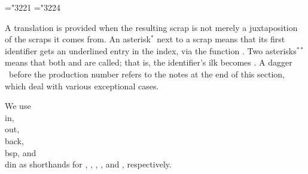 \def\v{\char'174}
\mathchardef\RA="3221 %
\mathchardef\BA="3224 %

A translation is provided when the resulting scrap is not merely a
juxtaposition of the scraps it comes from.  An asterisk$^*$ next to a scrap
means that its first identifier gets an underlined entry in the index,
via the function .  Two asterisks$^{**}$ means that
both
 and  are called; that is, the
identifier's ilk becomes .  A dagger \dag\ before the
production number refers to the notes at the end of this section,
which deal with various exceptional cases.

We use \\{in}, \\{out}, \\{back}, \\{bsp}, and \\{din} as shorthands for
, , , , and %
, respectively.

